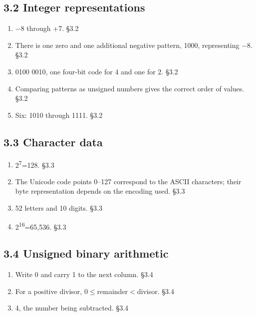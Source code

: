 \documentclass[11pt]{article}
\begin{document}
\begin{keepsection}\subsection{3.2 Integer representations}

\begin{enumerate}
\item \ensuremath{-}8 through +7. \hfill{\small\color{FAUblue}§3.2}
\item There is one zero and one additional negative pattern, 1000, representing \ensuremath{-}8. \hfill{\small\color{FAUblue}§3.2}
\item 0100 0010, one four-bit code for 4 and one for 2. \hfill{\small\color{FAUblue}§3.2}
\item Comparing patterns as unsigned numbers gives the correct order of values. \hfill{\small\color{FAUblue}§3.2}
\item Six: 1010 through 1111. \hfill{\small\color{FAUblue}§3.2}
\end{enumerate}

\end{keepsection}
\begin{keepsection}\subsection{3.3 Character data}

\begin{enumerate}
\item 2\textsuperscript{7}=128. \hfill{\small\color{FAUblue}§3.3}
\item The Unicode code points 0–127 correspond to the ASCII characters; their byte representation depends on the encoding used. \hfill{\small\color{FAUblue}§3.3}
\item 52 letters and 10 digits. \hfill{\small\color{FAUblue}§3.3}
\item 2\textsuperscript{16}=65,536. \hfill{\small\color{FAUblue}§3.3}
\end{enumerate}

\end{keepsection}
\begin{keepsection}\subsection{3.4 Unsigned binary arithmetic}

\begin{enumerate}
\item Write 0 and carry 1 to the next column. \hfill{\small\color{FAUblue}§3.4}
\item For a positive divisor, 0\ensuremath{\leq}remainder\ensuremath{<}divisor. \hfill{\small\color{FAUblue}§3.4}
\item 4, the number being subtracted. \hfill{\small\color{FAUblue}§3.4}
\end{enumerate}

\end{keepsection}
\end{document}

